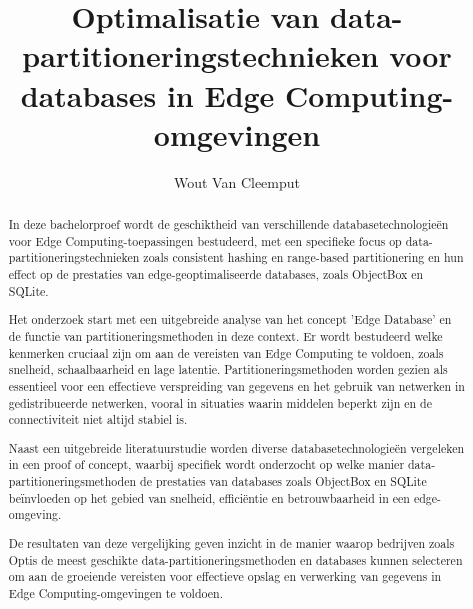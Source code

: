 \documentclass{hogent-article}
\title{Optimalisatie van data-partitioneringstechnieken voor databases in Edge Computing-omgevingen}
\author{Wout Van Cleemput}
\begin{document}
\begin{abstract}
In deze bachelorproef wordt de geschiktheid van verschillende databasetechnologieën voor Edge Computing-toepassingen bestudeerd,
  met een specifieke focus op data-partitioneringstechnieken zoals consistent hashing en range-based partitionering en hun effect op de prestaties van edge-geoptimaliseerde databases, zoals ObjectBox en SQLite.

Het onderzoek start met een uitgebreide analyse van het concept 'Edge Database' en de functie van partitioneringsmethoden in deze context. Er wordt bestudeerd welke kenmerken cruciaal zijn om aan de vereisten van Edge Computing te voldoen, zoals snelheid, schaalbaarheid en lage latentie. Partitioneringsmethoden worden gezien als essentieel voor een effectieve verspreiding van gegevens en het gebruik van netwerken in gedistribueerde netwerken,
  vooral in situaties waarin middelen beperkt zijn en de connectiviteit niet altijd stabiel is.

Naast een uitgebreide literatuurstudie worden diverse databasetechnologieën vergeleken in een proof of concept, waarbij specifiek wordt onderzocht op welke manier data-partitioneringsmethoden de prestaties van databases zoals ObjectBox en SQLite beïnvloeden op het gebied van snelheid,
 efficiëntie en betrouwbaarheid in een edge-omgeving.

De resultaten van deze vergelijking geven inzicht in de manier waarop bedrijven zoals Optis de meest geschikte data-partitioneringsmethoden
 en databases kunnen selecteren om aan de groeiende vereisten voor effectieve opslag en verwerking van gegevens in Edge Computing-omgevingen te voldoen.

\end{abstract}

\tableofcontents



\printbibliography[heading=bibintoc]
\end{document}
